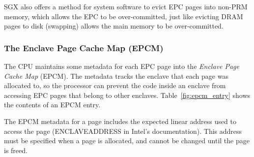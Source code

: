 SGX also offers a method for system software to evict EPC pages into non-PRM
memory, which allows the EPC to be over-committed, just like evicting DRAM
pages to disk (swapping) allows the main memory to be over-committed.


\subsubsection{The Enclave Page Cache Map (EPCM)}
\label{sec:epcm}

The CPU maintains some metadata for each EPC page into the \textit{Enclave Page
Cache Map} (EPCM). The metadata tracks the enclave that each page was allocated
to, so the processor can prevent the code inside an enclave from accessing EPC
pages that belong to other enclaves. Table~\ref{fig:epcm_entry} shows the
contents of an EPCM entry.


\begin{table}[hbt]
  \caption{
    The fields in an EPCM entry.
  }
  \label{fig:epcm_entry}
\end{table}



The EPCM metadata for a page includes the expected linear address used to
access the page (ENCLAVEADDRESS in Intel's documentation). This address must be
specified when a page is allocated, and cannot be changed until the page is
freed.

